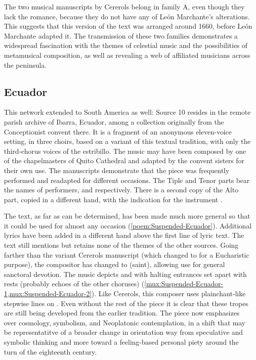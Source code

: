The two musical manuscripts by Cererols belong in family A, even though they
lack the romance, because they do not have any of León Marchante's
alterations.
This suggests that this version of the text was arranged around 1660, before
León Marchante adapted it.
The transmission of these two families demonstrates a widespread fascination
with the themes of celestial music and the possibilities of metamusical
composition, as well as revealing a web of affiliated musicians across the
peninsula.

\subsection{Ecuador}

This network extended to South America as well: Source 10 resides in the remote
parish archive of Ibarra, Ecuador, among a collection originally from the
Conceptionist convent there.
It is a fragment of an anonymous eleven-voice setting, in three choirs, based on
a variant of this textual tradition, with only the third-chorus voices of the
estribillo.
The music may have been composed by one of the chapelmasters of Quito Cathedral
and adapted by the convent sisters for their own use.%
The manuscripts demonstrate that the piece was frequently performed and
readapted for different occasions.
The Tiple and Tenor parts bear the names of performers, 
and  respectively.
There is a second copy of the Alto part, copied in a different hand, with the
indication for the instrument . %

The text, as far as can be determined, has been made much more general so that
it could be used for almost any occasion (\cref{poem:Suspended-Ecuador}).
Additional lyrics have been added in a different hand above the first line of
lyric text. %
The text still mentions  but retains none of the themes of the
other sources.
Going farther than the variant Cererols manuscript (which changed 
to  for a Eucharistic purpose), the compositor has changed
 to  (saint), allowing use for general sanctoral
devotion.
The music depicts  and  with halting
entrances set apart with rests (probably echoes of the other choruses)
(\cref{mux:Suspended-Ecuador-1,mux:Suspended-Ecuador-2}).
Like Cererols, this composer uses plainchant-like stepwise lines on .
Even without the rest of the piece it is clear that these tropes are still being
developed from the earlier tradition.
The piece now emphasizes  over cosmology, symbolism,
and Neoplatonic contemplation, in a shift that may be representatitve of a
broader change in orientation way from speculative and symbolic thinking and
more toward a feeling-based personal piety around the turn of the eighteenth
century.

